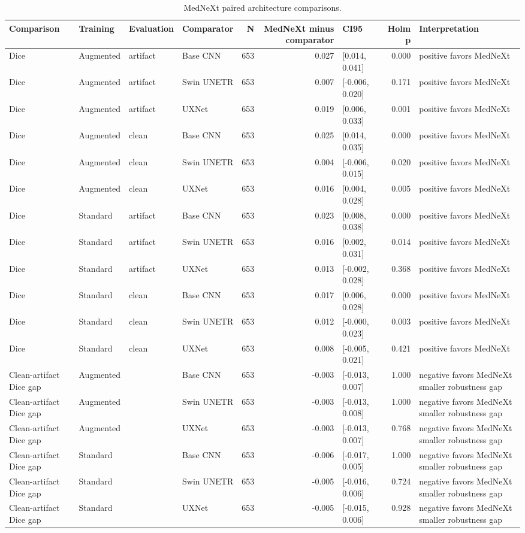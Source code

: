 \begin{table}
\caption{MedNeXt paired architecture comparisons.}
\label{tab:mednext_architecture_comparisons}
\begin{tabular}{llllrrlrl}
\toprule
Comparison & Training & Evaluation & Comparator & N & MedNeXt minus comparator & CI95 & Holm p & Interpretation \\
\midrule
Dice & Augmented & artifact & Base CNN & 653 & 0.027 & [0.014, 0.041] & 0.000 & positive favors MedNeXt \\
Dice & Augmented & artifact & Swin UNETR & 653 & 0.007 & [-0.006, 0.020] & 0.171 & positive favors MedNeXt \\
Dice & Augmented & artifact & UXNet & 653 & 0.019 & [0.006, 0.033] & 0.001 & positive favors MedNeXt \\
Dice & Augmented & clean & Base CNN & 653 & 0.025 & [0.014, 0.035] & 0.000 & positive favors MedNeXt \\
Dice & Augmented & clean & Swin UNETR & 653 & 0.004 & [-0.006, 0.015] & 0.020 & positive favors MedNeXt \\
Dice & Augmented & clean & UXNet & 653 & 0.016 & [0.004, 0.028] & 0.005 & positive favors MedNeXt \\
Dice & Standard & artifact & Base CNN & 653 & 0.023 & [0.008, 0.038] & 0.000 & positive favors MedNeXt \\
Dice & Standard & artifact & Swin UNETR & 653 & 0.016 & [0.002, 0.031] & 0.014 & positive favors MedNeXt \\
Dice & Standard & artifact & UXNet & 653 & 0.013 & [-0.002, 0.028] & 0.368 & positive favors MedNeXt \\
Dice & Standard & clean & Base CNN & 653 & 0.017 & [0.006, 0.028] & 0.000 & positive favors MedNeXt \\
Dice & Standard & clean & Swin UNETR & 653 & 0.012 & [-0.000, 0.023] & 0.003 & positive favors MedNeXt \\
Dice & Standard & clean & UXNet & 653 & 0.008 & [-0.005, 0.021] & 0.421 & positive favors MedNeXt \\
Clean-artifact Dice gap & Augmented &  & Base CNN & 653 & -0.003 & [-0.013, 0.007] & 1.000 & negative favors MedNeXt smaller robustness gap \\
Clean-artifact Dice gap & Augmented &  & Swin UNETR & 653 & -0.003 & [-0.013, 0.008] & 1.000 & negative favors MedNeXt smaller robustness gap \\
Clean-artifact Dice gap & Augmented &  & UXNet & 653 & -0.003 & [-0.013, 0.007] & 0.768 & negative favors MedNeXt smaller robustness gap \\
Clean-artifact Dice gap & Standard &  & Base CNN & 653 & -0.006 & [-0.017, 0.005] & 1.000 & negative favors MedNeXt smaller robustness gap \\
Clean-artifact Dice gap & Standard &  & Swin UNETR & 653 & -0.005 & [-0.016, 0.006] & 0.724 & negative favors MedNeXt smaller robustness gap \\
Clean-artifact Dice gap & Standard &  & UXNet & 653 & -0.005 & [-0.015, 0.006] & 0.928 & negative favors MedNeXt smaller robustness gap \\
\bottomrule
\end{tabular}
\end{table}
